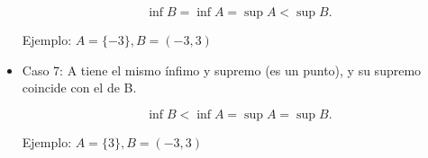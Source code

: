 \documentclass{article}
\begin{document}
\begin{itemize}
\begin{equation}
\mathop{\text{inf}} B = \mathop{\text{inf}} A = \mathop{\text{sup}} A < \mathop{\text{sup}} B.
\end{equation}

Ejemplo: $ A = \{-3\}, B = (-3,3) $

\item Caso 7: A tiene el mismo ínfimo y supremo (es un punto), y su supremo coincide con el de B.

\begin{equation}
\mathop{\text{inf}} B < \mathop{\text{inf}} A = \mathop{\text{sup}} A = \mathop{\text{sup}} B.
\end{equation}

Ejemplo: $ A = \{3\}, B = (-3,3) $

\end{itemize}
\end{document}
